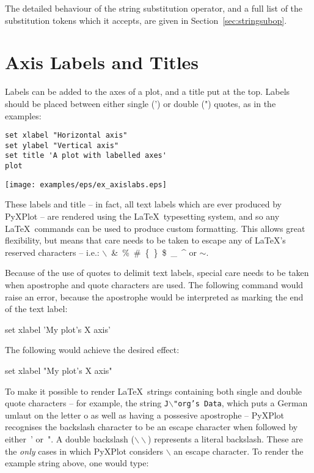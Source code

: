 The detailed behaviour of the string substitution operator, and a full list of
the substitution tokens which it accepts, are given in
Section~\ref{sec:stringsubop}.

\section{Axis Labels and Titles}
\label{sec:latex_incompatibility}

Labels can be added to the axes of a plot, and a title put at the top.  Labels
should be placed between either single (') or double (") quotes, as in the
examples:

\begin{verbatim}
set xlabel "Horizontal axis"
set ylabel "Vertical axis"
set title 'A plot with labelled axes'
plot
\end{verbatim}

\begin{center}
\texttt{[image: examples/eps/ex\_axislabs.eps]}
\end{center}

\noindent These labels and title -- in fact, all text labels which are ever
produced by PyXPlot -- are rendered using the \LaTeX\ typesetting system, and
so any \LaTeX\ commands can be used to produce custom formatting. This allows
great flexibility, but means that care needs to be taken to escape any of
\LaTeX's reserved characters -- i.e.: $\backslash$~\&~\%~\#~\{~\}~\$~\_~\^{} or
$\sim$.

Because of the use of quotes to delimit text labels, special care needs to be
taken when apostrophe and quote characters are used. The following command
would raise an error, because the apostrophe would be interpreted as marking
the end of the text label:

\begin{dontdo}
set xlabel 'My plot's X axis'
\end{dontdo}

\noindent The following would achieve the desired effect:

\begin{dodo}
set xlabel "My plot's X axis"
\end{dodo}

To make it possible to render \LaTeX\ strings containing both single and double
quote characters -- for example, the string {\tt J$\backslash$"org's Data},
which puts a German umlaut on the letter o as well as having a possesive
apostrophe -- PyXPlot recognises the backslash character to be an escape
character when followed by either~' or~". A double backslash
($\backslash\backslash$) represents a literal backslash. These are the
\textit{only} cases in which PyXPlot considers $\backslash$ an escape
character. To render the example string above, one would type:

